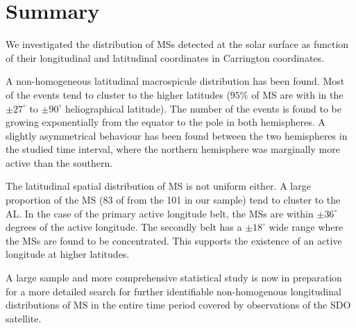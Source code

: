 \section{Summary}
We investigated the distribution of MSs detected at the solar surface as function of their longitudinal and latitudinal coordinates in Carrington coordinates.

A non-homogeneous latitudinal macrospicule distribution has been found. Most of the events tend to cluster to the higher latitudes ($95\%$ of MS are with in the $\pm27^{\circ}$ to $\pm90^{\circ}$ heliographical latitude). The number of the events is found to be growing exponentially from the equator to the pole in both hemispheres. A slightly asymmetrical behaviour has been found between the two hemispheres in the studied time interval, where the northern hemisphere was marginally more active than the southern. 

The latitudinal spatial distribution of MS is not uniform either. A large proportion of the MS (83 of from the 101 in our sample) tend to cluster to the AL. In the case of the primary active longitude belt, the MSs are within $\pm 36^{\circ}$ degrees of the active longitude. The secondly belt has a $\pm 18^{\circ}$ wide range where the MSs are found to be concentrated. This supports the existence of an active longitude at higher latitudes.

A large sample and more comprehensive statistical study is now in preparation for a more detailed search for further identifiable non-homogenous longitudinal distributions of MS in the entire time period covered by observations of the SDO satellite.
